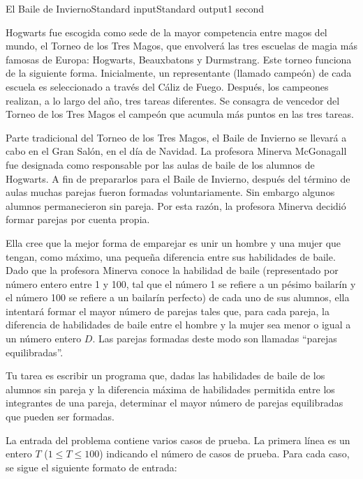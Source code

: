 \begin{problem}{El Baile de Invierno}{Standard input}{Standard output}{1 second}{}


Hogwarts fue escogida como sede de la mayor competencia entre magos del mundo, el Torneo de los Tres Magos, que envolverá las tres escuelas de magia más famosas de Europa: Hogwarts, Beauxbatons y Durmstrang. Este torneo funciona de la siguiente forma. Inicialmente, un representante (llamado campeón) de cada escuela es seleccionado a través del Cáliz de Fuego. Después, los campeones realizan, a lo largo del año, tres tareas diferentes. Se consagra de vencedor del Torneo de los Tres Magos el campeón  que acumula más puntos en las tres tareas.

Parte tradicional del Torneo de los Tres Magos, el Baile de Invierno se llevará a cabo en el Gran Salón, en el día de Navidad. La profesora Minerva McGonagall fue designada como responsable por las aulas de baile de los alumnos de Hogwarts. A fin de prepararlos para el Baile de Invierno, después del término de aulas muchas parejas fueron formadas voluntariamente. Sin embargo algunos alumnos permanecieron sin pareja. Por esta razón, la profesora Minerva decidió formar parejas por cuenta propia.

Ella cree que la mejor forma de emparejar es unir un hombre y una mujer que tengan, como máximo, una pequeña diferencia entre sus habilidades de baile. Dado que la profesora Minerva conoce la habilidad de baile (representado por número entero entre 1 y 100, tal que el número 1 se refiere a un pésimo bailarín y el número 100 se refiere a un bailarín perfecto) de cada uno de sus alumnos, ella intentará formar el mayor número de parejas tales que, para cada pareja, la diferencia de habilidades de baile entre el hombre y la mujer sea menor o igual a un número entero $D$. Las parejas formadas deste modo son llamadas “parejas equilibradas”.

Tu tarea es escribir un programa que, dadas las habilidades de baile de los alumnos sin pareja y la diferencia máxima de habilidades permitida entre los integrantes de una pareja, determinar el mayor número de parejas equilibradas que pueden ser formadas.

\InputFile

La entrada del problema contiene varios casos de prueba. La primera línea es un entero $T$ ($1\leq T \leq 100$) indicando el número de casos de prueba. Para cada caso, se sigue el siguiente formato de entrada:


\end{problem}
